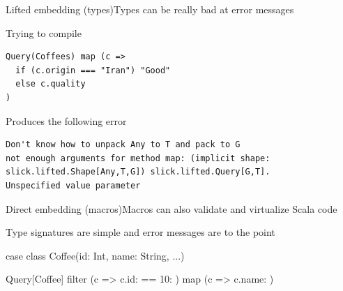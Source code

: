 \documentclass{beamer}
\begin{document}
\begin{frame}[fragile]{Lifted embedding (types)}{Types can be really bad at error messages}
  \vspace{1em}
  \begin{exampleblock}{Trying to compile}
    \begin{verbatim}
Query(Coffees) map (c =>
  if (c.origin === "Iran") "Good"
  else c.quality
)\end{verbatim}
  \end{exampleblock}

  \vspace{1em}
  \begin{alertblock}{Produces the following error}
    \begin{verbatim}
Don't know how to unpack Any to T and pack to G
not enough arguments for method map: (implicit shape:
slick.lifted.Shape[Any,T,G]) slick.lifted.Query[G,T].
Unspecified value parameter
    \end{verbatim}
  \end{alertblock}

\end{frame}

\begin{frame}[fragile]{Direct embedding (macros)}{Macros can also validate and virtualize Scala code}
  \vspace{1em}
  \begin{exampleblock}{Type signatures are simple and error messages are to the point}
  \begin{semiverbatim}
case class Coffee(id: Int, name: String, ...)

Query[Coffee] filter
  (c => c.id: \text{\color{blue}{Int}} == 10: \text{\color{blue}{Int}}) map
  (c => c.name: \text{\color{blue}{String}})
  \end{semiverbatim}
  \end{exampleblock}
\end{frame}
\end{document}
